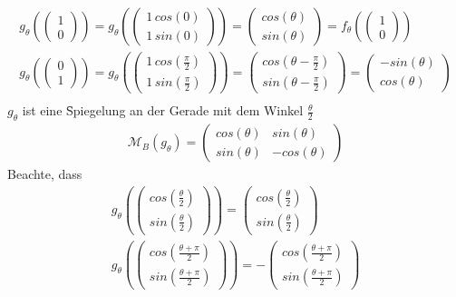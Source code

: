 \begin{align}
g_{\theta} (\begin{pmatrix} 1 \\ 0 \end{pmatrix}) = g_{\theta} (\begin{pmatrix} 1\, cos (0) \\ 1\, sin (0) \end{pmatrix}) = \begin{pmatrix} cos (\theta) \\ sin(\theta)\end{pmatrix} = f_{\theta} (\begin{pmatrix} 1 \\ 0 \end{pmatrix}) \\
g_{\theta} (\begin{pmatrix} 0 \\ 1 \end{pmatrix}) = g_{\theta} (\begin{pmatrix} 1\, cos (\frac{\pi}{2}) \\ 1\, sin (\frac{\pi}{2}) \end{pmatrix}) = \begin{pmatrix} cos (\theta - \frac{\pi}{2}) \\ sin(\theta - \frac{\pi}{2})\end{pmatrix} =  \begin{pmatrix} - sin(\theta) \\ cos(\theta)\end{pmatrix}\\
\end{align}
$g_{\theta}$ ist eine \f{Spiegelung} an der Gerade mit dem Winkel $\frac{\theta}{2}$
\begin{align}
\mathcal{M}_B(g_{\theta}) = \begin{pmatrix} cos(\theta) & sin(\theta) \\ sin(\theta) & -cos(\theta)\end{pmatrix}
\end{align}
Beachte, dass
\begin{align}
g_{\theta}(\begin{pmatrix} cos(\frac{\theta}{2}) \\ sin(\frac{\theta}{2})\end{pmatrix}) = \begin{pmatrix} cos(\frac{\theta}{2}) \\ sin(\frac{\theta}{2}) \end{pmatrix} \\
g_{\theta}(\begin{pmatrix} cos(\frac{\theta+ \pi}{2}) \\ sin(\frac{\theta+\pi}{2})\end{pmatrix}) = -\begin{pmatrix} cos(\frac{\theta+\pi}{2}) \\ sin(\frac{\theta+\pi}{2}) \end{pmatrix} \\
\end{align}
